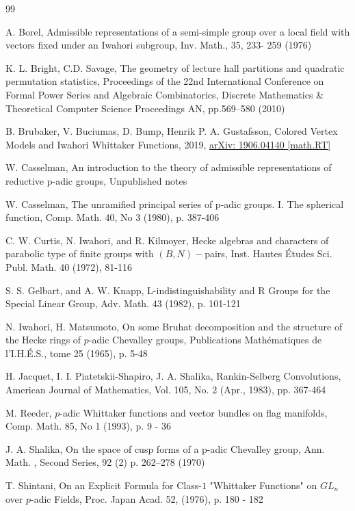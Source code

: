 \documentclass{article}
\begin{document}
\begin{thebibliography}{99}

A. Borel, Admissible representations of a semi-simple group over a local field with vectors fixed under an Iwahori subgroup, Inv. Math., 35, 233- 259 (1976)

K. L. Bright, C.D. Savage,
The geometry of lecture hall partitions and quadratic permutation statistics,
Proceedings of the 22nd International Conference on Formal Power Series and Algebraic Combinatorics,
Discrete Mathematics \& Theoretical Computer Science Proceedings AN, pp.569--580 (2010)

B. Brubaker, V. Buciumas, D. Bump, Henrik P. A. Gustafsson, Colored Vertex Models and Iwahori Whittaker Functions, 2019, \href{https://arxiv.org/abs/1906.04140}{arXiv: 1906.04140 [math.RT]}

W. Casselman, An introduction to the theory of admissible representations of reductive p-adic groups, Unpublished notes

W. Casselman, The unramified principal series of p-adic groups. I. The spherical function, Comp. Math. 40, No 3 (1980), p. 387-406


C. W. Curtis, N. Iwahori, and R. Kilmoyer, Hecke algebras and characters of parabolic type of finite groups with $(B,N)-$pairs, Inst. Hautes Études Sci. Publ. Math. 40 (1972), 81-116


S. S. Gelbart, and A. W. Knapp, {L}-indistinguishability and {R} Groups for the Special Linear Group, Adv. Math. 43 (1982), p. 101-121


N. Iwahori, H. Matsumoto, On some Bruhat decomposition and the structure of the Hecke rings of $p$-adic Chevalley groups,
Publications Mathématiques de l’I.H.É.S.,  tome 25 (1965), p. 5-48



H. Jacquet, I. I. Piatetskii-Shapiro, J. A. Shalika, Rankin-Selberg Convolutions, American Journal of Mathematics, Vol. 105, No. 2 (Apr., 1983), pp. 367-464





M. Reeder, $p$-adic Whittaker functions and vector bundles on flag manifolds, Comp. Math. 85, No 1 (1993), p. 9 - 36


J. A. Shalika, On the space of cusp forms of a p-adic Chevalley group, Ann. Math. , Second Series, 92 (2) p. 262–278 (1970)





T. Shintani, On an Explicit Formula for Class-$1$ "Whittaker Functions" on $GL_n$ over $p$-adic Fields, Proc. Japan Acad. 52, (1976), p. 180 - 182








\end{thebibliography}
\end{document}
